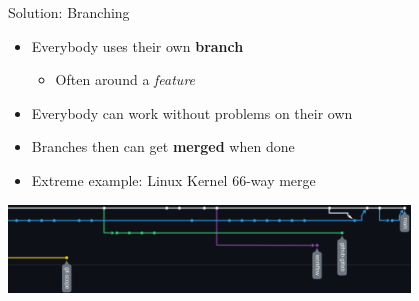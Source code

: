 \documentclass[compress,aspectratio=169]{beamer}
\begin{document}
  \begin{frame}{Solution: Branching}
    \begin{itemize}
      \item Everybody uses their own \textbf{branch}
        \begin{itemize}
          \item Often around a \emph{feature}
        \end{itemize}
      \item Everybody can work without problems on their own
      \item Branches then can get \textbf{merged} when done
      \item Extreme example: Linux Kernel 66-way merge
    \end{itemize}
    \pause
    \begin{center}
      \includegraphics[width=0.8\textwidth]{./assets/guitarhero.png}
    \end{center}
  \end{frame}
\end{document}
